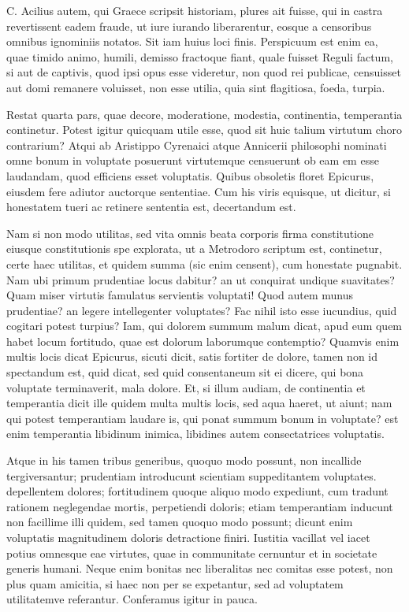  C. Acilius autem, qui Graece scripsit historiam, plures ait fuisse, qui in castra revertissent eadem fraude, ut iure iurando liberarentur, eosque a censoribus omnibus ignominiis notatos. Sit iam huius loci finis. Perspicuum est enim ea, quae timido animo, humili, demisso fractoque fiant, quale fuisset Reguli factum, si aut de captivis, quod ipsi opus esse videretur, non quod rei publicae, censuisset aut domi remanere voluisset, non esse utilia, quia sint flagitiosa, foeda, turpia.

 Restat quarta pars, quae decore, moderatione, modestia, continentia, temperantia continetur. Potest igitur quicquam utile esse, quod sit huic talium virtutum choro contrarium? Atqui ab Aristippo Cyrenaici atque Annicerii philosophi nominati omne bonum in voluptate posuerunt virtutemque censuerunt ob eam em esse laudandam, quod efficiens esset voluptatis. Quibus obsoletis floret Epicurus, eiusdem fere adiutor auctorque sententiae. Cum his viris equisque, ut dicitur, si honestatem tueri ac retinere sententia est, decertandum est.

 Nam si non modo utilitas, sed vita omnis beata corporis firma constitutione eiusque constitutionis spe explorata, ut a Metrodoro scriptum est, continetur, certe haec utilitas, et quidem summa (sic enim censent), cum honestate pugnabit. Nam ubi primum prudentiae locus dabitur? an ut conquirat undique suavitates? Quam miser virtutis famulatus servientis voluptati! Quod autem munus prudentiae? an legere intellegenter voluptates? Fac nihil isto esse iucundius, quid cogitari potest turpius? Iam, qui dolorem summum malum dicat, apud eum quem habet locum fortitudo, quae est dolorum laborumque contemptio? Quamvis enim multis locis dicat Epicurus, sicuti dicit, satis fortiter de dolore, tamen non id spectandum est, quid dicat, sed quid consentaneum sit ei dicere, qui bona voluptate terminaverit, mala dolore. Et, si illum audiam, de continentia et temperantia dicit ille quidem multa multis locis, sed aqua haeret, ut aiunt; nam qui potest temperantiam laudare is, qui ponat summum bonum in voluptate? est enim temperantia libidinum inimica, libidines autem consectatrices voluptatis.

 Atque in his tamen tribus generibus, quoquo modo possunt, non incallide tergiversantur; prudentiam introducunt scientiam suppeditantem voluptates. depellentem dolores; fortitudinem quoque aliquo modo expediunt, cum tradunt rationem neglegendae mortis, perpetiendi doloris; etiam temperantiam inducunt non facillime illi quidem, sed tamen quoquo modo possunt; dicunt enim voluptatis magnitudinem doloris detractione finiri. Iustitia vacillat vel iacet potius omnesque eae virtutes, quae in communitate cernuntur et in societate generis humani. Neque enim bonitas nec liberalitas nec comitas esse potest, non plus quam amicitia, si haec non per se expetantur, sed ad voluptatem utilitatemve referantur. Conferamus igitur in pauca.


